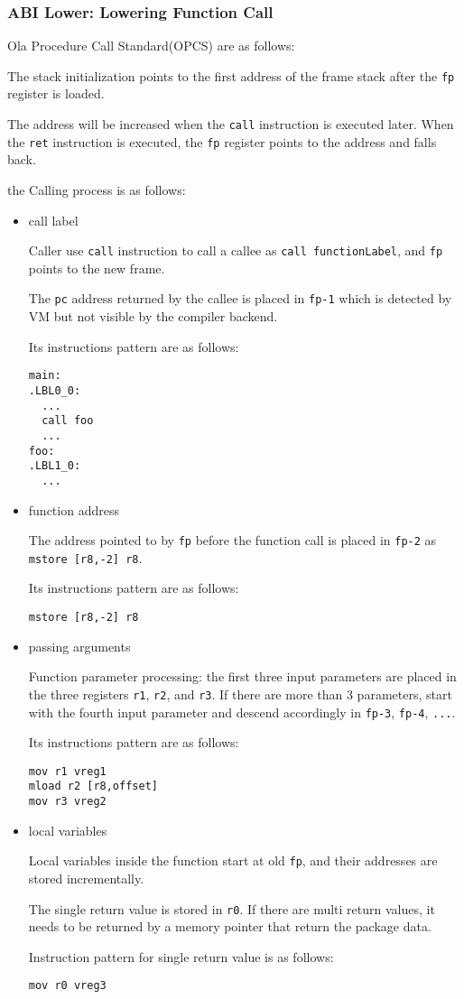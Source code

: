 \subsubsection{ABI Lower: Lowering Function Call}
    
Ola Procedure Call Standard(OPCS) are as follows:

The stack initialization points to the first address of the frame stack after the \texttt{fp} register is loaded.
    
The address will be increased when the \texttt{call} instruction is executed later.
When the \texttt{ret} instruction is executed, the \texttt{fp} register points to the address and falls back.
    
    
the Calling process is as follows:
\begin{itemize}
    \item call label

Caller use \texttt{call} instruction to call a callee as \texttt{call functionLabel}, and \texttt{fp} points to the new frame.\par
The \texttt{pc} address returned by the callee is placed in \texttt{fp-1} which is detected by VM but not visible by the compiler backend.\par
Its instructions pattern are as follows:
\begin{lstlisting}[language={}]
main:
.LBL0_0:
  ...
  call foo
  ...
foo:
.LBL1_0:
  ...
\end{lstlisting}
    \item function address

The address pointed to by \texttt{fp} before the function call is placed in \texttt{fp-2} as \texttt{mstore [r8,-2] r8}.\par
Its instructions pattern are as follows:
\begin{lstlisting}[language={}]
mstore [r8,-2] r8
\end{lstlisting}
    \item passing arguments

Function parameter processing: the first three input parameters are placed in the three registers \texttt{r1}, \texttt{r2}, and \texttt{r3}.
If there are more than 3 parameters, start with the fourth input parameter and descend accordingly in \texttt{fp-3}, \texttt{fp-4}, \texttt{...}. \par
Its instructions pattern are as follows:
\begin{lstlisting}[language={}]
mov r1 vreg1
mload r2 [r8,offset]
mov r3 vreg2
\end{lstlisting}
    \item  local variables

Local variables inside the function start at old \texttt{fp}, and their addresses are stored incrementally.

The single return value is stored in \texttt{r0}. If there are multi return values, it needs to be returned by a memory pointer that return the package data.\par
Instruction pattern for single return value is as follows:
\begin{lstlisting}[language={}]
mov r0 vreg3
\end{lstlisting}
\end{itemize}


